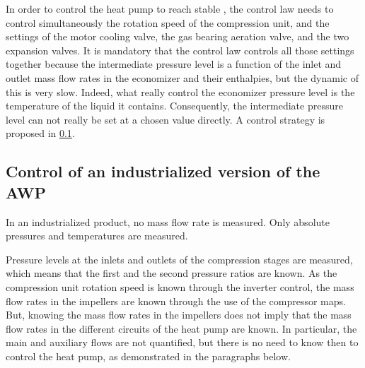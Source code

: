 In order to control the heat pump to reach stable \OP{}, the control
law needs to control simultaneously the rotation speed of the
compression unit, and the settings of the motor cooling valve, the gas
bearing aeration valve, and the two expansion valves. It is mandatory
that the control law controls all those settings together because the
intermediate pressure level is a function of the inlet and outlet mass
flow rates in the economizer and their enthalpies, but the dynamic of
this is very slow. Indeed, what really control the economizer pressure
level is the temperature of the liquid it contains. Consequently, the
intermediate pressure level can not really be set at a chosen value
directly. A control strategy is proposed in
\cref{sec:awp-issue-control-indus}.

\subsection{Control of an industrialized version of the AWP}
\label{sec:awp-issue-control-indus}

In an industrialized product, no mass flow rate is measured. Only
absolute pressures and temperatures are measured.

Pressure levels at the inlets and outlets of the compression stages
are measured, which means that the first and the second pressure
ratios are known. As the compression unit rotation speed is known
through the inverter control, the mass flow rates in the impellers are
known through the use of the compressor maps. But, knowing the mass
flow rates in the impellers does not imply that the mass flow rates in
the different circuits of the heat pump are known. In particular, the
main and auxiliary flows are not quantified, but there is no need to
know then to control the heat pump, as demonstrated in the paragraphs
below.

